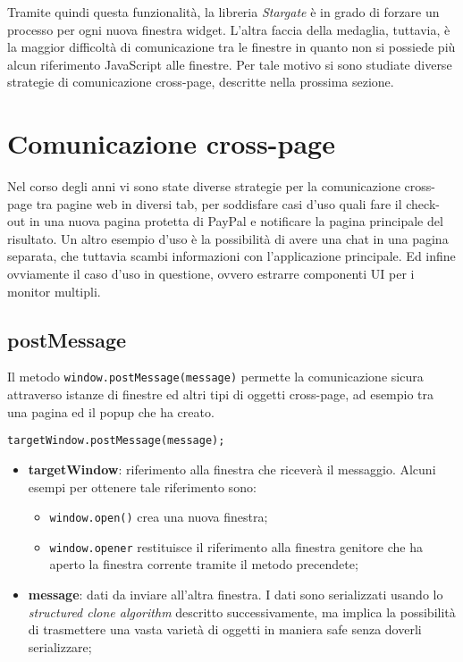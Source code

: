 Tramite quindi questa funzionalità, la libreria \textit{Stargate} è in grado di forzare un processo per ogni nuova finestra widget. L'altra faccia della medaglia, tuttavia, è la maggior difficoltà di comunicazione tra le finestre in quanto non si possiede più alcun riferimento JavaScript alle finestre. Per tale motivo si sono studiate diverse strategie di comunicazione cross-page, descritte nella prossima sezione.

\section{Comunicazione cross-page}

Nel corso degli anni vi sono state diverse strategie per la comunicazione cross-page tra pagine web in diversi tab, per soddisfare casi d'uso quali fare il check-out in una nuova pagina protetta di PayPal e notificare la pagina principale del risultato. Un altro esempio d'uso è la possibilità di avere una chat in una pagina separata, che tuttavia scambi informazioni con l'applicazione principale. Ed infine ovviamente il caso d'uso in questione, ovvero estrarre componenti UI per i monitor multipli. \\

\subsection{postMessage}

Il metodo \texttt{window.postMessage(message)} permette la comunicazione sicura attraverso istanze di finestre ed altri tipi di oggetti cross-page, ad esempio tra una pagina ed il popup che ha creato.

\texttt{targetWindow.postMessage(message);}

\begin{itemize}
    \item \textbf{targetWindow}: riferimento alla finestra che riceverà il messaggio. Alcuni esempi per ottenere tale riferimento sono:
        \begin{itemize}
            \item \texttt{window.open()} crea una nuova finestra;
            \item \texttt{window.opener} restituisce il riferimento alla finestra genitore che ha aperto la finestra corrente tramite il metodo precendete;
        \end{itemize}
    \item \textbf{message}: dati da inviare all'altra finestra. I dati sono serializzati usando lo \textit{structured clone algorithm} descritto successivamente, ma implica la possibilità di trasmettere una vasta varietà di oggetti in maniera safe senza doverli serializzare;
\end{itemize}

